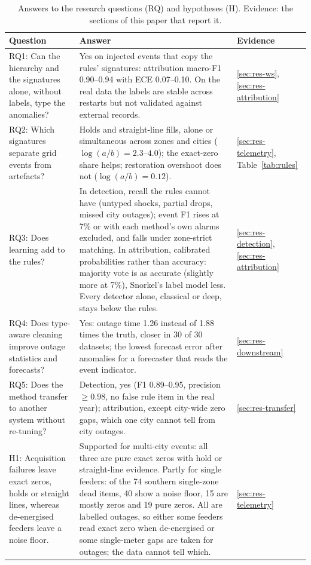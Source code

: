 \begin{table}[htbp]
\centering
\caption{Answers to the research questions (RQ) and hypotheses (H). Evidence: the sections of this paper that report it.}
\label{tab:answers}
\scriptsize
\setlength{\tabcolsep}{4pt}
\begin{tabularx}{\textwidth}{@{}L{4.2cm} Y l@{}}
\toprule
Question & Answer & Evidence \\
\midrule
RQ1: Can the hierarchy and the signatures alone, without labels, type the anomalies? & Yes on injected events that copy the rules' signatures: attribution macro-F1 0.90--0.94 with ECE 0.07--0.10. On the real data the labels are stable across restarts but not validated against external records. & \ref{sec:res-ws}, \ref{sec:res-attribution} \\
RQ2: Which signatures separate grid events from artefacts? & Holds and straight-line fills, alone or simultaneous across zones and cities ($\log(a/b) = 2.3$--$4.0$); the exact-zero share helps; restoration overshoot does not ($\log(a/b) = 0.12$). & \ref{sec:res-telemetry}, Table~\ref{tab:rules} \\
RQ3: Does learning add to the rules? & In detection, recall the rules cannot have (untyped shocks, partial drops, missed city outages); event F1 rises at 7\% or with each method's own alarms excluded, and falls under zone-strict matching. In attribution, calibrated probabilities rather than accuracy: majority vote is as accurate (slightly more at 7\%), Snorkel's label model less. Every detector alone, classical or deep, stays below the rules. & \ref{sec:res-detection}, \ref{sec:res-attribution} \\
RQ4: Does type-aware cleaning improve outage statistics and forecasts? & Yes: outage time 1.26 instead of 1.88 times the truth, closer in 30 of 30 datasets; the lowest forecast error after anomalies for a forecaster that reads the event indicator. & \ref{sec:res-downstream} \\
RQ5: Does the method transfer to another system without re-tuning? & Detection, yes (F1 0.89--0.95, precision $\geq 0.98$, no false rule item in the real year); attribution, except city-wide zero gaps, which one city cannot tell from city outages. & \ref{sec:res-transfer} \\
\midrule
H1: Acquisition failures leave exact zeros, holds or straight lines, whereas de-energised feeders leave a noise floor. & Supported for multi-city events: all three are pure exact zeros with hold or straight-line evidence. Partly for single feeders: of the 74 southern single-zone dead items, 40 show a noise floor, 15 are mostly zeros and 19 pure zeros. All are labelled outages, so either some feeders read exact zero when de-energised or some single-meter gaps are taken for outages; the data cannot tell which. & \ref{sec:res-telemetry} \\

\end{tabularx}
\end{table}
